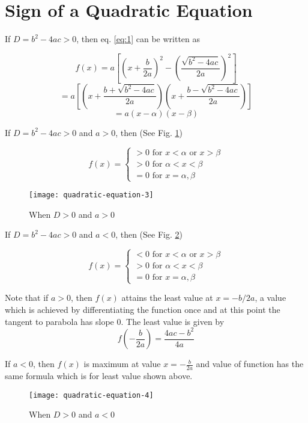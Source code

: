 \section{Sign of a Quadratic Equation}
If $D = b^2 - 4ac > 0$, then eq. \ref{eq:1} can be written as

$$f(x) = a\left[\left(x + \frac{b}{2a}\right)^2 - \left(\frac{\sqrt{b^2 - 4ac}}{2a}\right)^2\right]$$
$$= a\left[\left(x + \frac{b + \sqrt{b^2 - 4ac}}{2a}\right)\left(x + \frac{b - \sqrt{b^2 - 4ac}}{2a}\right)\right]$$
$$= a(x - \alpha)(x - \beta)$$

If $D = b^2 - 4ac > 0$ and $a > 0$, then (See Fig. \ref{fig:3})

$$f(x) = \begin{cases}> 0\text{~for~}x <\alpha\text{~or~}x
  >\beta\\>0\text{~for~}\alpha<x<\beta\\=0\text{~for~}x=\alpha,\beta\end{cases}$$

\begin{figure}[H]
  \begin{center}
    \texttt{[image: quadratic-equation-3]}
    \caption{When $D > 0$ and $a > 0$}
    \label{fig:3}
  \end{center}
\end{figure}

If $D = b^2 - 4ac > 0$ and $a < 0$, then (See Fig. \ref{fig:4})

$$f(x) = \begin{cases}< 0\text{~for~}x <\alpha\text{~or~}x
  >\beta\\>0\text{~for~}\alpha<x<\beta\\=0\text{~for~}x=\alpha,\beta\end{cases}$$

Note that if $a > 0$, then $f(x)$ attains the least value at $x = -b/2a$, a value which is achieved by differentiating the function
once and at this point the tangent to parabola has slope $0$. The least value is given by
$$f\left(-\frac{b}{2a}\right) = \frac{4ac - b^2}{4a}$$

If $a < 0$, then $f(x)$ is maximum at value $x = -\frac{b}{2a}$ and value of function has the same formula which is for least value
shown above.

\begin{figure}[H]
  \begin{center}
    \texttt{[image: quadratic-equation-4]}
    \caption{When $D > 0$ and $a < 0$}
    \label{fig:4}
  \end{center}
\end{figure}

